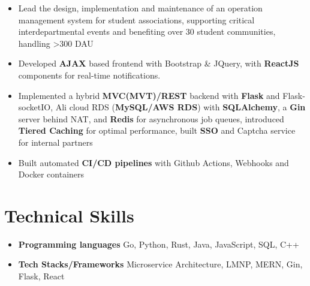 \documentclass[a4,12pt]{article}
\newenvironment{zitemize}{
\begin{itemize}\itemsep0pt \parskip0pt \parsep1pt}
{\end{itemize}\vspace{-0.5cm}}
\begin{document}
    \begin{zitemize}
        \item Lead the design, implementation and maintenance of an operation management system for student associations, supporting critical interdepartmental events and benefiting over 30 student communities, handling >300 DAU
        \item Developed \textbf{AJAX} based frontend with Bootstrap \& JQuery, with \textbf{ReactJS} components for real-time notifications.
        \item Implemented a hybrid \textbf{MVC(MVT)/REST} backend with \textbf{Flask} and Flask-socketIO, Ali cloud RDS (\textbf{MySQL/AWS RDS}) with \textbf{SQLAlchemy}, a \textbf{Gin} server behind NAT, and \textbf{Redis} for asynchronous job queues, introduced \textbf{Tiered Caching} for optimal performance, built \textbf{SSO} and Captcha service for internal partners 
        \item Built automated \textbf{CI/CD pipelines} with Github Actions, Webhooks and Docker containers
    \end{zitemize}





\vspace{-0.4cm}
\section{\textbf{Technical Skills}}
\vspace{-0.2cm}
\begin{zitemize}
    \item \textbf{Programming languages} Go, Python, Rust, Java, JavaScript, SQL, C++
    \item \textbf{Tech Stacks/Frameworks} Microservice Architecture, LMNP, MERN, Gin, Flask, React
\end{zitemize}
\end{document}
